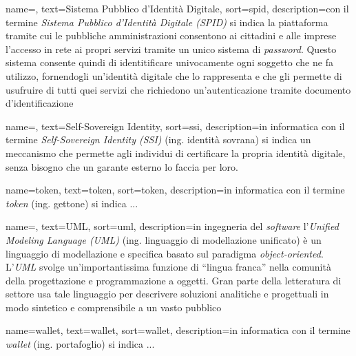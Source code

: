 {
	name=,
	text=Sistema Pubblico d'Identità Digitale,
	sort=spid,
	description={con il termine \emph{Sistema Pubblico d'Identità Digitale (SPID)} si indica la piattaforma tramite cui le pubbliche amministrazioni consentono ai cittadini e alle imprese l'accesso in rete ai propri servizi tramite un unico sistema di \textit{password}. Questo sistema consente quindi di identitificare univocamente ogni soggetto che ne fa utilizzo, fornendogli un'identità digitale che lo rappresenta e che gli permette di usufruire di tutti quei servizi che richiedono un'autenticazione tramite documento d'identificazione}
}

{
	name=,
	text=Self-Sovereign Identity,
	sort=ssi,
	description={in informatica con il termine \emph{Self-Sovereign Identity (SSI)} (ing. identità sovrana) si indica un meccanismo che permette agli individui di certificare la propria identità digitale, senza bisogno che un garante esterno lo faccia per loro.}
}

{
	name=token,
	text=token,
	sort=token,
	description={in informatica con il termine \emph{token} (ing. gettone) si indica ...}
}

{
    name=,
    text=UML,
    sort=uml,
    description={in ingegneria del \textit{software} l'\emph{Unified Modeling Language (UML)} (ing. linguaggio di modellazione unificato) è un linguaggio di modellazione e specifica basato sul paradigma \textit{object-oriented}. L'\emph{UML} svolge un'importantissima funzione di ``lingua franca'' nella comunità della progettazione e programmazione a oggetti. Gran parte della letteratura di settore usa tale linguaggio per descrivere soluzioni analitiche e progettuali in modo sintetico e comprensibile a un vasto pubblico}
}

{
	name=wallet,
	text=wallet,
	sort=wallet,
	description={in informatica con il termine \emph{wallet} (ing. portafoglio) si indica ...}
}
